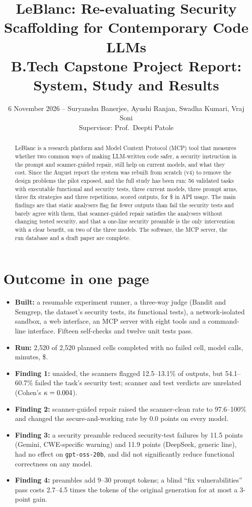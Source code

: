 \documentclass[11pt]{article}
\title{LeBlanc: Re-evaluating Security Scaffolding for Contemporary Code LLMs\\[0.4em]
\large B.Tech Capstone Project Report: System, Study and Results}
\author{6 November 2026 \;--\; Suryanshu Banerjee, Ayushi Ranjan, Swadha Kumari, Vraj Soni\\
\small Supervisor: Prof.\ Deepti Patole}
\date{}
\begin{document}
\maketitle

\begin{abstract}
LeBlanc is a research platform and Model Context Protocol (MCP) tool that measures whether two common ways of making
LLM-written code safer, a security instruction in the prompt and scanner-guided repair, still help on current
models, and what they cost. Since the August report the system was rebuilt from scratch (v4) to remove the design
problems the pilot exposed, and the full study has been run: 56 validated tasks with executable functional and
security tests, three current models, three prompt arms, three fix strategies and three repetitions, \NCells{}
scored outputs, for \$\TotalCost{} in API usage. The main findings are that static analysers flag far fewer outputs
than fail the security tests and barely agree with them, that scanner-guided repair satisfies the analysers without
changing tested security, and that a one-line security preamble is the only intervention with a clear benefit, on
two of the three models. The software, the MCP server, the run database and a draft paper are complete.
\end{abstract}

\section{Outcome in one page}
\begin{itemize}
\item \textbf{Built:} a resumable experiment runner, a three-way judge (Bandit and Semgrep, the dataset's security
      tests, its functional tests), a network-isolated sandbox, a web interface, an MCP server with eight tools and
      a command-line interface. Fifteen self-checks and twelve unit tests pass.
\item \textbf{Run:} 2{,}520 of 2{,}520 planned cells completed with no failed cell, \NCalls{} model calls,
      \RunMinutes{} minutes, \$\TotalCost{}.
\item \textbf{Finding 1:} unaided, the scanners flagged 12.5--13.1\% of outputs, but 54.1--60.7\% failed the task's
      security test; scanner and test verdicts are unrelated (Cohen's $\kappa=0.004$).
\item \textbf{Finding 2:} scanner-guided repair raised the scanner-clean rate to 97.6--100\% and changed the
      secure-and-working rate by 0.0 points on every model.
\item \textbf{Finding 3:} a security preamble reduced security-test failures by 11.5 points (Gemini, CWE-specific
      warning) and 11.9 points (DeepSeek, generic line), had no effect on \texttt{gpt-oss-20b}, and did not
      significantly reduce functional correctness on any model.
\item \textbf{Finding 4:} preambles add 9--30 prompt tokens; a blind ``fix vulnerabilities'' pass costs 2.7--4.5 times
      the tokens of the original generation for at most a 3-point gain.
\end{itemize}
\end{document}
